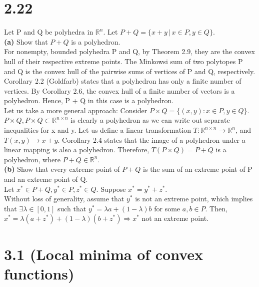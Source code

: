 \documentclass{article}
\begin{document}
\pagebreak
\section*{2.22}
Let P and Q be polyhedra in $\mathbb{R}^n$.  Let $P + Q = \{x + y \, | \, x \in P, y \in Q\}$.\\

\noindent \textbf{(a)} Show that $P + Q$ is a polyhedron.\\

\noindent
For nonempty, bounded polyhedra P and Q, by Theorem 2.9, they are the convex hull of their respective extreme points.  The Minkowsi sum of two polytopes P and Q is the convex hull of the pairwise sums of vertices of P and Q, respectively.  Corollary 2.2 (Goldfarb) states that a polyhedron has only a finite number of vertices.  By Corollary 2.6, the convex hull of a finite number of vectors is a polyhedron.  Hence, P + Q in this case is a polyhedron.\\

\noindent
Let us take a more general approach:  Consider $P \times Q = \{(x,y): x \in P, y\in Q \}$.  $P \times Q, P \times Q \subset \mathbb{R}^{n \times n}$ is clearly a polyhedron as we can write out separate inequalities for x and y.  Let us define a linear transformation $T: \mathbb{R}^{n \times n} \rightarrow \mathbb{R}^n$, and $T(x,y) \rightarrow x + y$.  Corollary 2.4 states that the image of a polyhedron under a linear mapping is also a polyhedron.  Therefore, $T(P \times Q) = P + Q$ is a polyhedron, where $P + Q \in \mathbb{R}^n$.\\

\noindent \textbf{(b)} Show that every extreme point of $P + Q$ is the sum of an extreme point of P and an extreme point of Q.\\

\noindent
Let $x^* \in P + Q, y^* \in P,  z^* \in Q.$  Suppose $x^* = y^* + z ^*$.\\
Without loss of generality, assume that $y^*$ is not an extreme point, which implies that $\exists \lambda \in [0,1]$ such that $y^* = \lambda a + (1-\lambda) b$ for some $a,b \in P$.  Then, $x^* = \lambda (a + z^*) + (1 - \lambda)(b+ z^*) \Rightarrow x^*$ not an extreme point.\\

\section*{3.1 (Local minima of convex functions)} 
\end{document}
